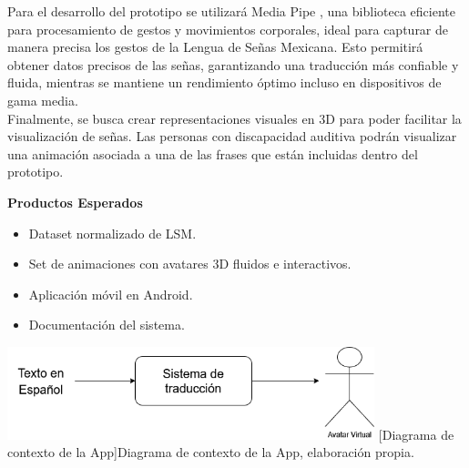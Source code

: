 Para el desarrollo del prototipo se utilizará Media Pipe \cite{ref7}, una biblioteca eficiente para procesamiento de gestos y movimientos corporales, ideal para capturar de manera precisa los gestos de la Lengua de Señas Mexicana. Esto permitirá obtener datos precisos de las señas, garantizando una traducción más confiable y fluida, mientras se mantiene un rendimiento óptimo incluso en dispositivos de gama media.\\

Finalmente, se busca crear representaciones visuales en 3D para poder facilitar la visualización de señas. Las personas con discapacidad auditiva podrán visualizar una animación asociada a una de las frases que están incluidas dentro del prototipo.

\textbf{Productos Esperados}
\begin{itemize}
    \item Dataset normalizado de LSM.
    \item Set de animaciones con avatares 3D fluidos e interactivos.
    \item Aplicación móvil en Android.
    \item Documentación del sistema.\\
\end{itemize}

\begin{center}
    \includegraphics[width=0.8\textwidth]{Images/Cap 1/diacajanegra.png}
    [Diagrama de contexto de la App]{Diagrama de contexto de la App, elaboración propia.}
\end{center}

\newpage
